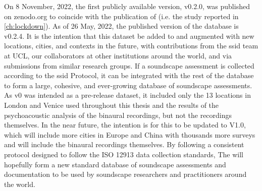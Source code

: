 On 8 November, 2022, the first publicly available version, v0.2.0, was published on zenodo.org to coincide with the publication of \citet{Mitchell2021Investigating} (i.e. the study reported in \cref{ch:lockdown}). As of 26 May, 2022, the published version of the database is v0.2.4. It is the intention that this dataset be added to and augmented with new locations, cities, and contexts in the future, with contributions from the \gls{ssid} team at UCL, our collaborators at other institutions around the world, and via submissions from similar research groups. If a soundscape assessment is collected according to the \gls{ssid} Protocol, it can be integrated with the rest of the database to form a large, cohesive, and ever-growing database of soundscape assessments. As v0 was intended as a pre-release dataset, it included only the 13 locations in London and Venice used throughout this thesis and the results of the psychoacoustic analysis of the binaural recordings, but not the recordings themselves. In the near future, the intention is for this to be updated to V1.0, which will include more cities in Europe and China with thousands more surveys and will include the binaural recordings themselves. By following a consistent protocol designed to follow the ISO 12913 data collection standards, The  \citep{Mitchell2021International} will hopefully form a new standard database of soundscape assessments and documentation to be used by soundscape researchers and practitioners around the world.




